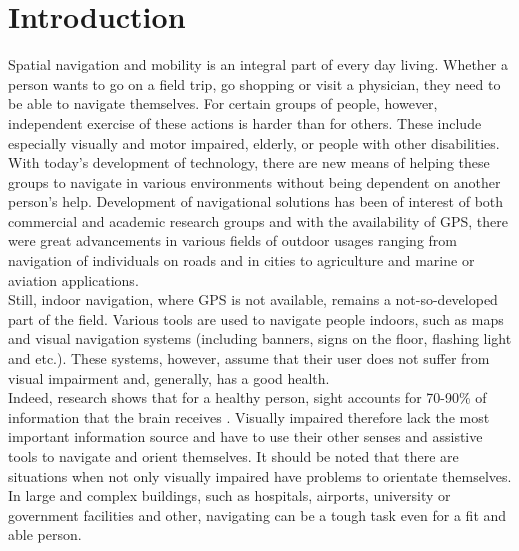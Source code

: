\chapter{Introduction}
Spatial navigation and mobility is an integral part of every day living. Whether a person wants to go on a field trip, go shopping or visit a physician, they need to be able to navigate themselves. For certain groups of people, however, independent exercise of these actions is harder than for others. These include especially visually and motor impaired, elderly, or people with other disabilities.\\
With today's development of technology, there are new means of helping these groups to navigate in various environments without being dependent on another person's help. Development of navigational solutions has been of interest of both commercial and academic research groups and with the availability of GPS, there were great advancements in various fields of outdoor usages ranging from navigation of individuals on roads and in cities to agriculture and marine or aviation applications.\\
Still, indoor navigation, where GPS is not available, remains a not-so-developed part of the field. Various tools are used to navigate people indoors, such as maps and visual navigation systems (including banners, signs on the floor, flashing light and etc.). These systems, however, assume that their user does not suffer from visual impairment and, generally, has a good health.\\Indeed, research shows that for a healthy person, sight accounts for 70-90\% of information that the brain receives \cite{hyerle}. Visually impaired therefore lack the most important information source and have to use their other senses and assistive tools to navigate and orient themselves. It should be noted that there are situations when not only visually impaired have problems to orientate themselves. In large and complex buildings, such as hospitals, airports, university or government facilities and other, navigating can be a tough task even for a fit and able person. 

